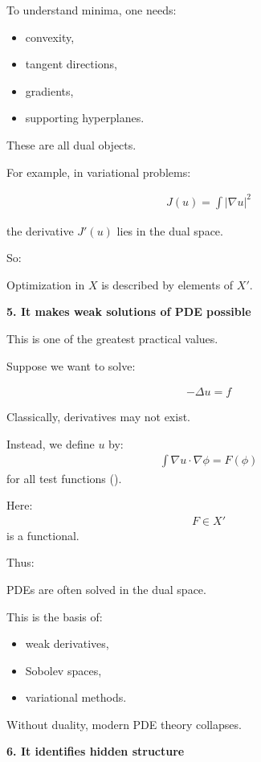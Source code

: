 \begin{description}
To understand minima, one needs:
	\begin{itemize}
    \item convexity,
    \item tangent directions,
    \item gradients,
    \item supporting hyperplanes.
	\end{itemize}
These are all dual objects.

For example, in variational problems:

\begin{align*}
J(u)=\int |\nabla u|^2
\end{align*}

the derivative $J'(u)$ lies in the dual space.

So:

\> Optimization in $X$ is described by elements of $X'$.

\item \textbf{5. It makes weak solutions of PDE possible}

This is one of the greatest practical values.

Suppose we want to solve:

\begin{align*}
-\Delta u=f
\end{align*}

Classically, derivatives may not exist.

Instead, we define $u$ by:
\begin{align*}
\int \nabla u\cdot \nabla \phi = F(\phi)
\end{align*}
for all test functions (\phi).

Here:
\begin{align*}
F\in X'
\end{align*}
is a functional.

Thus:

\> PDEs are often solved in the dual space.

This is the basis of:

	\begin{itemize}
    \item weak derivatives,
    \item Sobolev spaces,
    \item variational methods.
	\end{itemize}

Without duality, modern PDE theory collapses.

\item \textbf{6. It identifies hidden structure}


\end{description}
